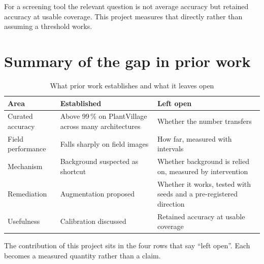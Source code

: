 For a screening tool the relevant question is not average accuracy but retained
accuracy at usable coverage. This project measures that directly rather than
assuming a threshold works.

\section{Summary of the gap in prior work}

\begin{table}[H]
\centering
\caption{What prior work establishes and what it leaves open}
\label{tab:litsummary}
\tabfont
\begin{tabularx}{\textwidth}{@{}p{3.1cm}Y Y@{}}
\toprule
\textbf{Area} & \textbf{Established} & \textbf{Left open} \\
\midrule
Curated accuracy & Above 99\,\% on PlantVillage across many architectures & Whether the number transfers \\
Field performance & Falls sharply on field images & How far, measured with intervals \\
Mechanism & Background suspected as shortcut & Whether background is relied on, measured by intervention \\
Remediation & Augmentation proposed & Whether it works, tested with seeds and a pre-registered direction \\
Usefulness & Calibration discussed & Retained accuracy at usable coverage \\
\bottomrule
\end{tabularx}
\end{table}

The contribution of this project sits in the four rows that say ``left open''. Each
becomes a measured quantity rather than a claim.
